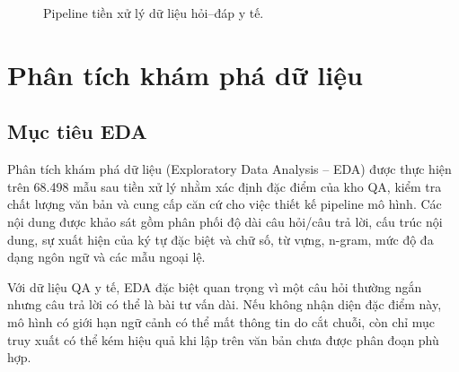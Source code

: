 \documentclass[12pt,a4paper,oneside]{report}
\begin{document}
\begin{figure}[H]
    \centering
    \caption{Pipeline tiền xử lý dữ liệu hỏi--đáp y tế.}
    \label{fig:data-preprocessing-pipeline}
\end{figure}

\section{Phân tích khám phá dữ liệu}
\subsection{Mục tiêu EDA}
Phân tích khám phá dữ liệu (Exploratory Data Analysis -- EDA) được thực hiện trên 68.498 mẫu sau tiền xử lý nhằm xác định đặc điểm của kho QA, kiểm tra chất lượng văn bản và cung cấp căn cứ cho việc thiết kế pipeline mô hình. Các nội dung được khảo sát gồm phân phối độ dài câu hỏi/câu trả lời, cấu trúc nội dung, sự xuất hiện của ký tự đặc biệt và chữ số, từ vựng, n-gram, mức độ đa dạng ngôn ngữ và các mẫu ngoại lệ.

Với dữ liệu QA y tế, EDA đặc biệt quan trọng vì một câu hỏi thường ngắn nhưng câu trả lời có thể là bài tư vấn dài. Nếu không nhận diện đặc điểm này, mô hình có giới hạn ngữ cảnh có thể mất thông tin do cắt chuỗi, còn chỉ mục truy xuất có thể kém hiệu quả khi lập trên văn bản chưa được phân đoạn phù hợp.
\end{document}
